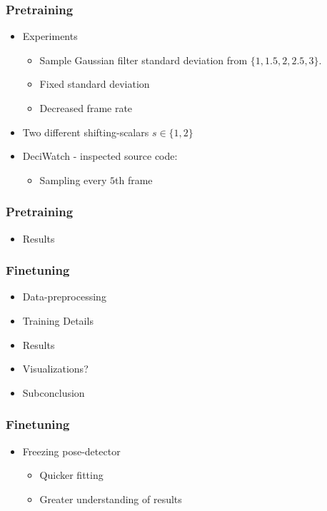\documentclass{beamer}
\begin{document}
\begin{frame}
    \frametitle{Pretraining}
    \begin{itemize}
        \item<1-> Experiments
        \begin{itemize}
            \item<1-> Sample Gaussian filter standard deviation from $\{1, 1.5, 2, 2.5, 3\}$.
            \item<2-> Fixed standard deviation
            \item<3-> Decreased frame rate
        \end{itemize}
        \item<4-> Two different shifting-scalars $s \in \{1, 2\}$
        \item<5-> DeciWatch - inspected source code:
        \begin{itemize}
            \item Sampling every $5$th frame
        \end{itemize}
    \end{itemize}
\end{frame}

\begin{frame}
    \frametitle{Pretraining}
    \begin{itemize}
        \item Results
    \end{itemize}
\end{frame}

\begin{frame}
    \frametitle{Finetuning}
    \begin{itemize}
        \item Data-preprocessing
        \item Training Details
        \item Results
        \item Visualizations?
        \item Subconclusion
    \end{itemize}
\end{frame}

\begin{frame}
    \frametitle{Finetuning}
    \begin{itemize}
        \item<1-> Freezing pose-detector
        \begin{itemize}
            \item<1-> Quicker fitting
            \item<2-> Greater understanding of results  
        \end{itemize}
    \end{itemize}
\end{frame}
\end{document}
